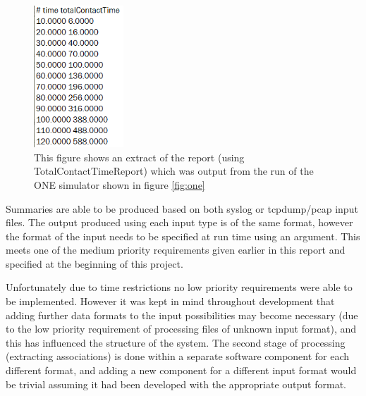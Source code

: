 \begin{figure}[h]
    \centering
    \includegraphics[width=0.3\textwidth]{contact_report.PNG}
    \caption{This figure shows an extract of the report (using TotalContactTimeReport) which was output from the run of the ONE simulator \cite{Keranen2009} shown in figure \ref{fig:one}}
    \label{fig:report}
\end{figure}

Summaries are able to be produced based on both syslog or tcpdump/pcap input files. The output produced using each input type is of the same format, however the format of the input needs to be specified at run time using an argument. This meets one of the medium priority requirements given earlier in this report and specified at the beginning of this project.

Unfortunately due to time restrictions no low priority requirements were able to be implemented. However it was kept in mind throughout development that adding further data formats to the input possibilities may become necessary (due to the low priority requirement of processing files of unknown input format), and this has influenced the structure of the system. The second stage of processing (extracting associations) is done within a separate software component for each different format, and adding a new component for a different input format would be trivial assuming it had been developed with the appropriate output format.